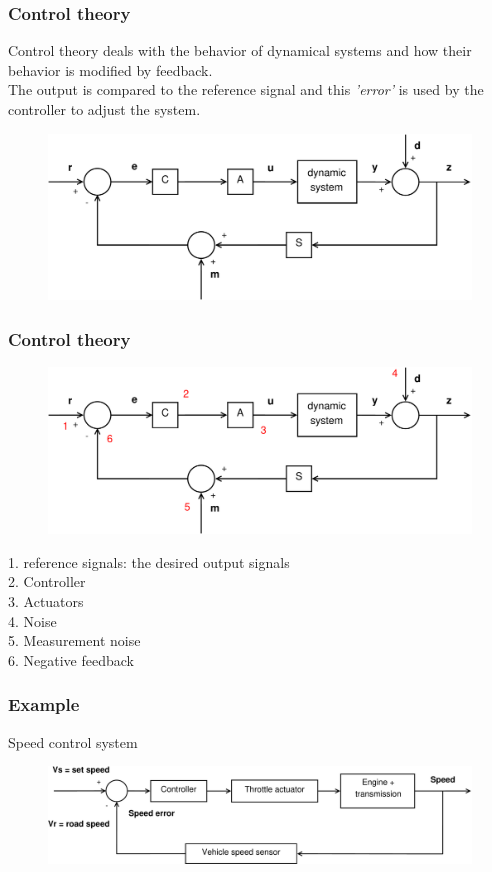\documentclass{beamer}
\begin{document}
\begin{frame}
\frametitle{Control theory}
Control theory deals with the behavior of dynamical systems and how their behavior is modified by feedback.\\
The output is compared to the reference signal and this \textit{'error'} is used by the controller to adjust the system. 
\medskip
\begin{figure}
\includegraphics[width=1\linewidth]{full_system1}
\end{figure}
\end{frame}


\begin{frame}
\frametitle{Control theory}
\begin{figure}
\includegraphics[width=.8\linewidth]{full_system2}
\end{figure}
\vspace{-2ex}
1. reference signals: the desired output signals\\
2. Controller\\
3. Actuators\\
4. Noise\\
5. Measurement noise\\
6. Negative feedback
\end{frame}


\begin{frame}
\frametitle{Example}
\vspace{-6ex}
Speed control system\\
\bigskip
\bigskip
\begin{figure}
\includegraphics[width=1\linewidth]{speed_control_system}
\end{figure}
\end{frame}
\end{document}
